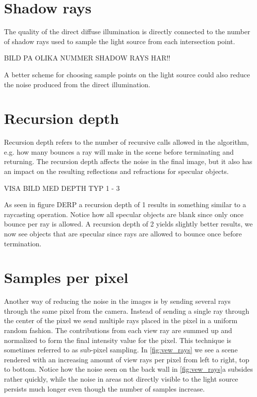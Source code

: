 \documentclass[]{report}   %
\begin{document}
\section{Shadow rays}
The quality of the direct diffuse illumination is directly connected to the number of shadow rays used to sample the light source from each intersection point.

BILD PA OLIKA NUMMER SHADOW RAYS HAR!!

A better scheme for choosing sample points on the light source could also reduce the noise produced from the direct illumination.
\section{Recursion depth}
Recursion depth refers to the number of recursive calls allowed in the algorithm, e.g. how many bounces a ray will make in the scene before terminating and returning. 
The recursion depth affects the noise in the final image, but it also has an impact on the resulting reflections and refractions for specular objects.

VISA BILD MED DEPTH TYP 1 - 3

As seen in figure DERP a recursion depth of 1 results in something similar to a raycasting operation. 
Notice how all specular objects are blank since only once bounce per ray is allowed. 
A recursion depth of 2 yields slightly better results, we now see objects that are specular since rays are allowed to bounce once before termination.

\section{Samples per pixel}
Another way of reducing the noise in the images is by sending several rays through the same pixel from the camera. 
Instead of sending a single ray through the center of the pixel we send multiple rays placed in the pixel in a uniform random fashion. 
The contributions from each view ray are summed up and normalized to form the final intensity value for the pixel. 
This technique is sometimes referred to as sub-pixel sampling. In \autoref{fig:vew_rays} we see a scene rendered with an increasing amount of view rays per pixel from left to right, top to bottom. 
Notice how the noise seen on the back wall in \autoref{fig:vew_rays}a subsides rather quickly, while the noise in areas not directly visible to the light source persists much longer even though the number of samples increase.
\end{document}
